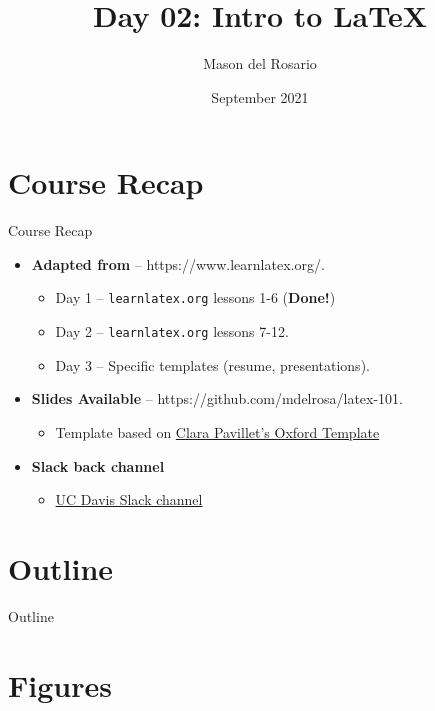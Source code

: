 \documentclass{beamer}
\title{Day 02: Intro to \LaTeX}
\author{\small{Mason del Rosario}}
\institute{\LaTeX 101}
\date{September 2021} %
\begin{document}
\footnotesize{
% 


{ 
\frame{\titlepage}}

  \section*{Course Recap}

  \begin{frame}{Course Recap}
    \begin{itemize} 
      \item \textbf{Adapted from} -- https://www.learnlatex.org/. 
        \begin{itemize}
          \item Day 1 -- \texttt{learnlatex.org} lessons 1-6 (\textbf{Done!})
          \item Day 2 -- \texttt{learnlatex.org} lessons 7-12.
          \item Day 3 -- Specific templates (resume, presentations).
        \end{itemize}
      \item \textbf{Slides Available} -- https://github.com/mdelrosa/latex-101.
      \begin{itemize}
        \item Template based on \href{https://www.overleaf.com/latex/templates/oxpav/xnjgrxthvjhg}{Clara Pavillet's Oxford Template}
      \end{itemize}
      \item \textbf{Slack back channel}
      \begin{itemize}
        \item \href{https://join.slack.com/share/zt-ul82okyc-SI2GftuwPx_lFyBXll9rjw}{UC Davis Slack channel}
      \end{itemize}
    \end{itemize}
  \end{frame}

  \section*{Outline}\begin{frame}{Outline}\tableofcontents\end{frame}

  \section{Figures}

}
\end{document}
